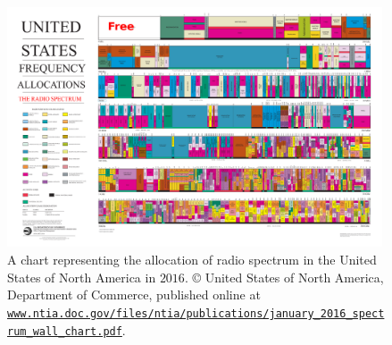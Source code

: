 \begin{figure}[h!]
    \centering
    \includegraphics[width=0.99\textwidth]{United_States_Frequency_Allocations_Chart_2016_The_Radio_Spectrum_3.pdf}
    \caption[A chart representing the allocation of radio spectrum in the United States of North America in $2016$]{A chart representing the allocation of radio spectrum in the United States of North America in $2016$. \copyright{} United States of North America, Department of Commerce, published online at \href{https://www.ntia.doc.gov/files/ntia/publications/january_2016_spectrum_wall_chart.pdf}{\texttt{www.ntia.doc.gov/files/ntia/publications/january\_2016\_spectrum\_wall\_chart.pdf}}.}
    \label{fig:1:United_States_Frequency_Allocations_Chart_2016_The_Radio_Spectrum}
\end{figure}

